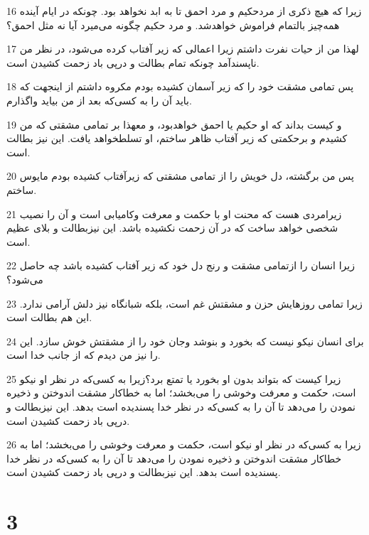 \par 16 زیرا که هیچ ذکری از مردحکیم و مرد احمق تا به ابد نخواهد بود. چونکه در ایام آینده همه‌چیز بالتمام فراموش خواهدشد. و مرد حکیم چگونه می‌میرد آیا نه مثل احمق؟
\par 17 لهذا من از حیات نفرت داشتم زیرا اعمالی که زیر آفتاب کرده می‌شود، در نظر من ناپسندآمد چونکه تمام بطالت و در‌پی باد زحمت کشیدن است.
\par 18 پس تمامی مشقت خود را که زیر آسمان کشیده بودم مکروه داشتم از اینجهت که باید آن را به کسی‌که بعد از من بیاید واگذارم.
\par 19 و کیست بداند که او حکیم یا احمق خواهدبود، و معهذا بر تمامی مشقتی که من کشیدم و برحکمتی که زیر آفتاب ظاهر ساختم، او تسلطخواهد یافت. این نیز بطالت است.
\par 20 پس من برگشته، دل خویش را از تمامی مشقتی که زیرآفتاب کشیده بودم مایوس ساختم.
\par 21 زیرامردی هست که محنت او با حکمت و معرفت وکامیابی است و آن را نصیب شخصی خواهد ساخت که در آن زحمت نکشیده باشد. این نیزبطالت و بلای عظیم است.
\par 22 زیرا انسان را ازتمامی مشقت و رنج دل خود که زیر آفتاب کشیده باشد چه حاصل می‌شود؟
\par 23 زیرا تمامی روزهایش حزن و مشقتش غم است، بلکه شبانگاه نیز دلش آرامی ندارد. این هم بطالت است.
\par 24 برای انسان نیکو نیست که بخورد و بنوشد وجان خود را از مشقتش خوش سازد. این را نیز من دیدم که از جانب خدا است.
\par 25 زیرا کیست که بتواند بدون او بخورد یا تمتع برد؟زیرا به کسی‌که در نظر او نیکو است، حکمت و معرفت وخوشی را می‌بخشد؛ اما به خطاکار مشقت اندوختن و ذخیره نمودن را می‌دهد تا آن را به کسی‌که در نظر خدا پسندیده است بدهد. این نیزبطالت و در‌پی باد زحمت کشیدن است.
\par 26 زیرا به کسی‌که در نظر او نیکو است، حکمت و معرفت وخوشی را می‌بخشد؛ اما به خطاکار مشقت اندوختن و ذخیره نمودن را می‌دهد تا آن را به کسی‌که در نظر خدا پسندیده است بدهد. این نیزبطالت و در‌پی باد زحمت کشیدن است.
 
\chapter{3}

